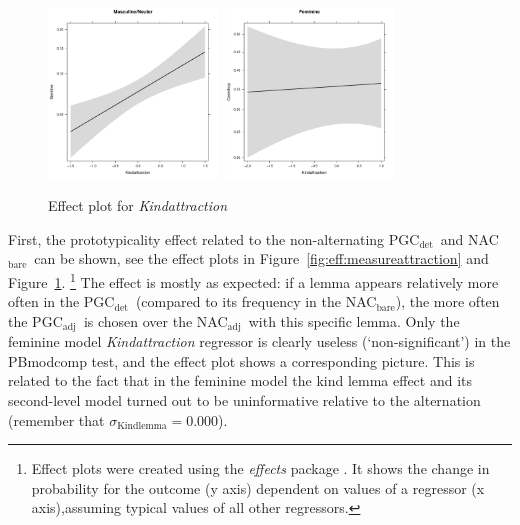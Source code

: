 \documentclass[USenglish]{article}
\newcommand{\Sub}[1]{\ensuremath{\mathrm{_{#1}}}}
\newcommand{\NACb}{NAC\Sub{bare}}
\newcommand{\NACa}{NAC\Sub{adj}}
\newcommand{\PGCd}{PGC\Sub{det}}
\newcommand{\PGCa}{PGC\Sub{adj}}
\begin{document}
\begin{figure}[h!]
  \centering
  \includegraphics[width=0.4\textwidth]{figures/corpus/04_glmm_fixeff_mn_Kindattraction}~\includegraphics[width=0.4\textwidth]{figures/corpus/04_glmm_fixeff_fem_Kindattraction}
  \caption{Effect plot for \textit{Kindattraction}}
  \label{fig:eff:kindattraction}
\end{figure}

First, the prototypicality effect related to the non-alternating \PGCd\ and \NACb\ can be shown, see the effect plots in Figure~\ref{fig:eff:measureattraction} and Figure~\ref{fig:eff:kindattraction}.%
\footnote{Effect plots were created using the \textit{effects} package \citep{Fox2003}.
It shows the change in probability for the outcome (y axis) dependent on values of a regressor (x axis),assuming typical values of all other regressors.}
The effect is mostly as expected:
if a lemma appears relatively more often in the \PGCd\ (compared to its frequency in the \NACb), the more often the \PGCa\ is chosen over the \NACa\ with this specific lemma.
Only the feminine model \textit{Kindattraction} regressor is clearly useless (`non-significant') in the PBmodcomp test, and the effect plot shows a corresponding picture.
This is related to the fact that in the feminine model the kind lemma effect and its second-level model turned out to be uninformative relative to the alternation (remember that $\sigma_{\text{Kindlemma}}=0.000$).

\end{document}
